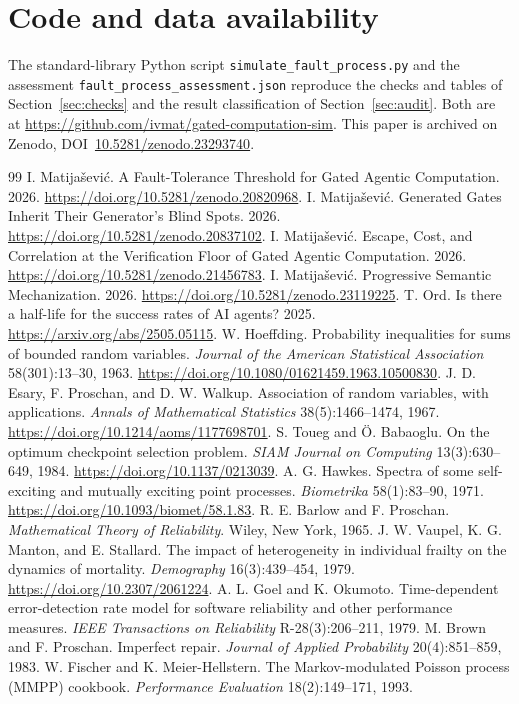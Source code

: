\documentclass[11pt]{article}
\theoremstyle{definition}
\theoremstyle{remark}
\begin{document}
\section*{Code and data availability}
\begin{sloppypar}
The standard-library Python script \texttt{simulate\_fault\_process.py} and the assessment
\texttt{fault\_process\_assessment.json} reproduce the checks and tables of Section~\ref{sec:checks} and the
result classification of Section~\ref{sec:audit}. Both are at \url{https://github.com/ivmat/gated-computation-sim}.
This paper is archived on Zenodo, DOI~\href{https://doi.org/10.5281/zenodo.23293740}{10.5281/zenodo.23293740}.
\end{sloppypar}

\begin{thebibliography}{99}
 I. Matija\v{s}evi\'c. A Fault-Tolerance Threshold for Gated Agentic Computation.
2026. \url{https://doi.org/10.5281/zenodo.20820968}.
 I. Matija\v{s}evi\'c. Generated Gates Inherit Their Generator's Blind Spots.
2026. \url{https://doi.org/10.5281/zenodo.20837102}.
 I. Matija\v{s}evi\'c. Escape, Cost, and Correlation at the Verification Floor of
Gated Agentic Computation. 2026. \url{https://doi.org/10.5281/zenodo.21456783}.
 I. Matija\v{s}evi\'c. Progressive Semantic Mechanization. 2026.
\url{https://doi.org/10.5281/zenodo.23119225}.
 T. Ord. Is there a half-life for the success rates of AI agents? 2025.
\url{https://arxiv.org/abs/2505.05115}.
 W. Hoeffding. Probability inequalities for sums of bounded random variables.
\emph{Journal of the American Statistical Association} 58(301):13--30, 1963.
\url{https://doi.org/10.1080/01621459.1963.10500830}.
 J. D. Esary, F. Proschan, and D. W. Walkup. Association of random variables,
with applications. \emph{Annals of Mathematical Statistics} 38(5):1466--1474, 1967.
\url{https://doi.org/10.1214/aoms/1177698701}.
 S. Toueg and \"O. Babaoglu. On the optimum checkpoint selection problem.
\emph{SIAM Journal on Computing} 13(3):630--649, 1984.
\url{https://doi.org/10.1137/0213039}.
 A. G. Hawkes. Spectra of some self-exciting and mutually exciting point processes.
\emph{Biometrika} 58(1):83--90, 1971.
\url{https://doi.org/10.1093/biomet/58.1.83}.
 R. E. Barlow and F. Proschan. \emph{Mathematical Theory of Reliability}.
Wiley, New York, 1965.
 J. W. Vaupel, K. G. Manton, and E. Stallard. The impact of heterogeneity in
individual frailty on the dynamics of mortality. \emph{Demography} 16(3):439--454, 1979.
\url{https://doi.org/10.2307/2061224}.
 A. L. Goel and K. Okumoto. Time-dependent error-detection rate model for software
reliability and other performance measures. \emph{IEEE Transactions on Reliability}
R-28(3):206--211, 1979.
 M. Brown and F. Proschan. Imperfect repair.
\emph{Journal of Applied Probability} 20(4):851--859, 1983.
 W. Fischer and K. Meier-Hellstern. The Markov-modulated Poisson process (MMPP)
cookbook. \emph{Performance Evaluation} 18(2):149--171, 1993.
\end{thebibliography}
\end{document}
